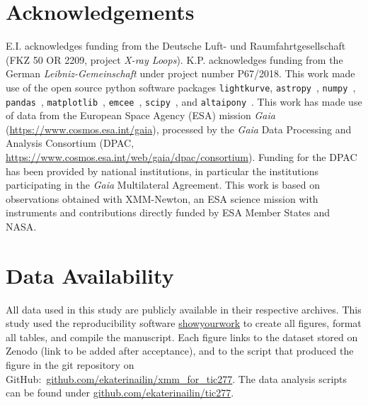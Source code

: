 \documentclass[twocolumn]{aastex631}
\begin{document}
\section*{Acknowledgements}
 E.I. acknowledges funding from the Deutsche Luft- und Raumfahrtgesellschaft (FKZ 50 OR 2209, project \textit{X-ray Loops}). K.P. acknowledges funding from the German \textit{Leibniz-Gemeinschaft} under project number P67/2018. 
This work made use of the open source python software packages \texttt{lightkurve}\citep{lightkurvecollaboration2018lightkurve}, \texttt{astropy}~\citep{robitaille2013astropy}, \texttt{numpy}~\citep{harris2020array}, \texttt{pandas}~\citep{reback2022pandasdev}, \texttt{matplotlib}~\citep{hunter2007matplotlib}, \texttt{emcee}~\citep{foreman-mackey2013emcee}, \texttt{scipy}~\citep{mckinney2010data}, and \texttt{altaipony}~\citep{ilin2021altaipony}. This work has made use of data from the European Space Agency (ESA) mission
{\it Gaia} (\url{https://www.cosmos.esa.int/gaia}), processed by the {\it Gaia}
Data Processing and Analysis Consortium (DPAC,
\url{https://www.cosmos.esa.int/web/gaia/dpac/consortium}). Funding for the DPAC
has been provided by national institutions, in particular the institutions
participating in the {\it Gaia} Multilateral Agreement.
This work is based on observations obtained with XMM-Newton, an ESA science mission with instruments and contributions directly funded by ESA Member States and NASA.
\section*{Data Availability}
All data used in this study are publicly available in their respective archives.
This study used the reproducibility software \href{https://github.com/showyourwork/showyourwork}{showyourwork}
\citep{luger2021mappinga} to create all figures, format all tables, and compile the manuscript. Each figure links to the dataset stored on Zenodo (link to be added after acceptance), and to the script that produced the figure in the git repository on GitHub:~\href{https://github.com/ekaterinailin/xmm_for_tic277}{github.com/ekaterinailin/xmm\_for\_tic277}. The data analysis scripts can be found under \href{https://github.com/ekaterinailin/tic277}{github.com/ekaterinailin/tic277}. 


\end{document}

